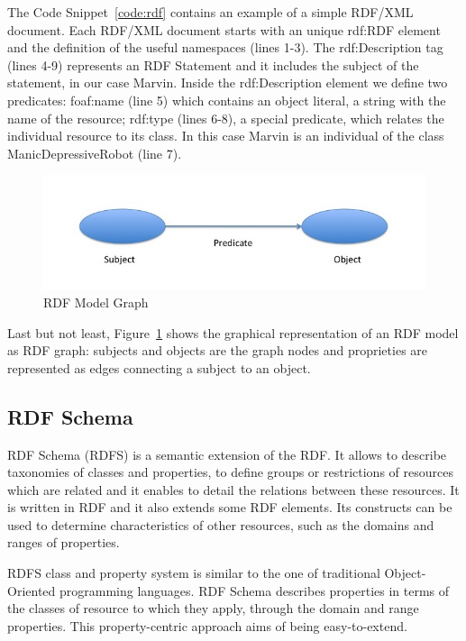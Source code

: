 The Code Snippet~\ref{code:rdf} contains an example of a simple RDF/XML document. Each RDF/XML document starts with an unique rdf:RDF element and the definition of the useful namespaces (lines 1-3). The rdf:Description tag (lines 4-9) represents an RDF Statement and it includes the subject of the statement, in our case Marvin. Inside the rdf:Description element we define two predicates: foaf:name (line 5) which contains an object literal, a string with the name of the resource; rdf:type (lines 6-8), a special predicate, which relates the individual resource to its class. In this case Marvin is an individual of the class ManicDepressiveRobot (line 7).

\begin{figure}[tbh]
  \centering
	\includegraphics[width=0.75\linewidth]{images/rdf-graph}
	\caption{RDF Model Graph} 
  	\label{fig:rdf-graph}
\end{figure}

Last but not least, Figure~\ref{fig:rdf-graph} shows the graphical representation of an RDF model as RDF graph:  subjects and objects are the graph nodes and proprieties are represented as edges connecting a subject to an object. 

\subsection{RDF Schema}\label{sec:rdfs}

RDF Schema (RDFS) is a semantic extension of the RDF. It allows to describe taxonomies of classes and properties, to define groups or restrictions of resources which are related and  it enables to detail the relations between these resources. It is written in RDF and it also extends some RDF elements. Its constructs can be used to determine characteristics of other resources, such as the domains and ranges of properties.

RDFS class and property system is similar to the one of traditional Object-Oriented programming languages. RDF Schema describes properties in terms of the classes of resource to which they apply, through the domain and range properties. This property-centric approach aims of being easy-to-extend.

